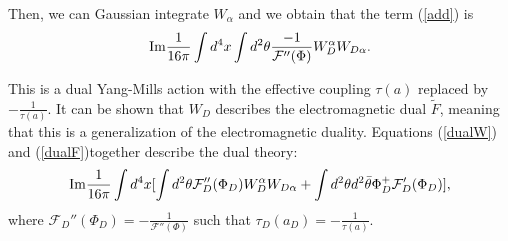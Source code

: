 \documentclass[12pt, onecolumn]{article}
\begin{document}
Then, we can Gaussian integrate $W_\alpha$ and we obtain that the term (\ref{add}) is
\begin{equation} 
{\rm Im} \frac{1}{16\pi}\int d^4x \int d^2 \theta \frac{-1}{\mathcal{F}''(\Phi)} W_D^{\alpha}W_{D \alpha}. \label{dualW}
\end{equation}

This is a dual Yang-Mills action with the effective coupling $\tau(a)$ replaced by $-\frac{1}{\tau(a)}$. It can be shown that $W_D$ describes the electromagnetic dual $\tilde{F}$, meaning that this is a generalization of the electromagnetic duality. Equations (\ref{dualW}) and (\ref{dualF})together describe the dual theory:
\begin{equation}
{\rm Im} \frac{1}{16\pi}\int d^4x [ \int d^2 \theta \mathcal{F}_D''(\Phi_D) W_D^{\alpha}W_{D\alpha} + \int d^2\theta d^2 \bar{\theta} \Phi_D^+ \mathcal{F}_D'(\Phi_D)], \label{eff-action-dual}
\end{equation}
where $\mathcal{F}_D''(\Phi_D) = -\frac{1}{\mathcal{F}''(\Phi)} $ such that $\tau_D(a_D)=-\frac{1}{\tau(a)}$. 
\end{document}
